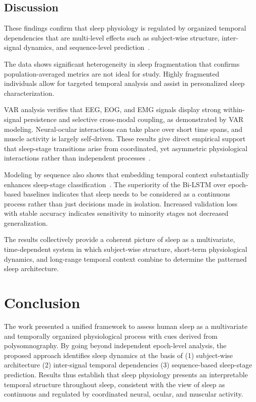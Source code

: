 \documentclass[10pt]{cai26}
\begin{document}
\subsection{Discussion}

These findings confirm that sleep physiology is regulated by organized temporal dependencies that are multi-level effects such as 
subject-wise structure, inter-signal dynamics, and sequence-level prediction~\cite{Phan2019,Phan2022,Li2024SleepFC}.

The data shows significant heterogeneity in sleep fragmentation that confirms population-averaged metrics are not ideal for study. 
Highly fragmented individuals allow for targeted temporal analysis and assist in personalized sleep characterization.

VAR analysis verifies that EEG, EOG, and EMG signals display strong within-signal persistence and selective cross-modal coupling, 
as demonstrated by VAR modeling. Neural-ocular interactions can take place over short time spans, and muscle activity is largely 
self-driven. These results give direct empirical support that sleep-stage transitions arise from coordinated, yet asymmetric 
physiological interactions rather than independent processes~\cite{Chen2019LFP}.

Modeling by sequence also shows that embedding temporal context substantially enhances sleep-stage classification~\cite{Supratak2017,Mousavi2019SleepEEGNet}. The superiority 
of the Bi-LSTM over epoch-based baselines indicates that sleep needs to be considered as a continuous process rather than just 
decisions made in isolation. Increased validation loss with stable accuracy indicates sensitivity to minority stages not 
decreased generalization.

The results collectively provide a coherent picture of sleep as a multivariate, time-dependent system in which subject-wise 
structure, short-term physiological dynamics, and long-range temporal context combine to determine the patterned sleep 
architecture.

\section{Conclusion}

The work presented a unified framework to assess human sleep as a multivariate and temporally organized physiological process 
with cues derived from polysomnography. By going beyond independent epoch-level analysis, the proposed approach identifies sleep 
dynamics at the basis of (1) subject-wise architecture (2) inter-signal temporal dependencies (3) sequence-based sleep-stage 
prediction. Results thus establish that sleep physiology presents an interpretable temporal structure throughout sleep, consistent 
with the view of sleep as continuous and regulated by coordinated neural, ocular, and muscular activity. 
\end{document}
